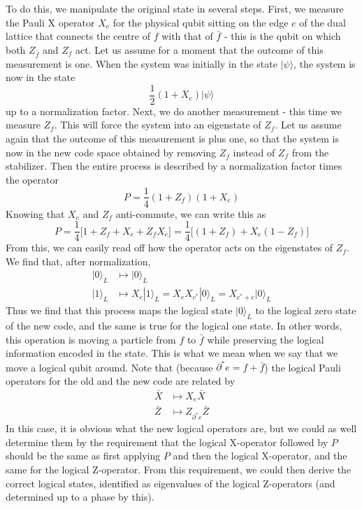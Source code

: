 \documentclass[a4paper, draft]{article}
\theoremstyle{own}
\theoremstyle{remark}
\begin{document}
To do this, we manipulate the original state in several steps. First, we measure the Pauli X operator $X_e$ for the physical qubit sitting on the edge $e$ of the dual lattice that connects the centre of $f$ with that of $\bar{f}$ - this is the qubit on which both $Z_{\bar{f}}$ and $Z_f$ act. Let us assume for a moment that the outcome of this measurement is one. When the system was initially in the state $|\psi\rangle$, the system is now in the state
$$
\frac{1}{2} (1 + X_e) |\psi \rangle
$$
up to a normalization factor. Next, we do another measurement - this time we measure $Z_f$. This will force the system into an eigenstate of $Z_f$. Let us assume again that the outcome of this measurement is plus one, so that the system is now in the new code space obtained by removing $Z_{\bar{f}}$ instead of $Z_f$ from the stabilizer. Then the entire process is described by a normalization factor times the operator
$$
P = \frac{1}{4}(1 + Z_f)(1 + X_e)
$$
Knowing that $X_e$ and $Z_f$ anti-commute, we can write this as
$$
P = \frac{1}{4} \big[ 1 + Z_f + X_e + Z_f X_e \big]
= \frac{1}{4} \big[ (1 + Z_f) + X_e (1 - Z_f) \big]
$$
From this, we can easily read off how the operator acts on the eigenstates of $Z_f$. We find that, after normalization,
\begin{align*}
|0 \rangle_L &\mapsto |0 \rangle_L \\
|1 \rangle_L &\mapsto X_e |1 \rangle_L = X_e X_{c^*} |0 \rangle_L = X_{c^* + e} |0 \rangle_L
\end{align*}
Thus we find that this process maps the logical state $|0 \rangle_L$ to the logical zero state of the new code, and the same is true for the logical one state. In other words, this operation is moving a particle from $f$ to $\bar{f}$ while preserving the logical information encoded in the state. This is what we mean when we say that we move a logical qubit around. Note that (because $\partial^* e = f + \bar{f}$) the logical Pauli operators for the old and the new code are related by
\begin{align*}
\bar{X} &\mapsto  X_e \bar{X} \\
\bar{Z} &\mapsto Z_{\partial^* e} \bar{Z}
\end{align*}
In this case, it is obvious what the new logical operators are, but we could as well determine them by the requirement that the logical X-operator followed by $P$ should be the same as first applying $P$ and then the logical X-operator, and the same for the logical Z-operator. From this requirement, we could then derive the correct logical states, identified as eigenvalues of the logical Z-operators (and determined up to a phase by this).
\end{document}
